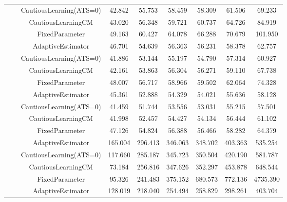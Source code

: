 \begin{table}[!h]
\begin{tabular}[t]{ccccccccc}
 &  & CautiousLearning(ATS=0) & 42.842 & 55.753 & 58.459 & 58.309 & 61.506 & 69.233\\

 &  & CautiousLearningCM & 43.020 & 56.348 & 59.721 & 60.737 & 64.726 & 84.919\\

 & \multirow[t]{-4}{*}{\centering\arraybackslash 1.00} & FixedParameter & 49.163 & 60.427 & 64.078 & 66.288 & 70.679 & 101.950\\
\cmidrule{2-9}
 &  & AdaptiveEstimator & 46.701 & 54.639 & 56.363 & 56.231 & 58.378 & 62.757\\

 &  & CautiousLearning(ATS=0) & 41.886 & 53.144 & 55.197 & 54.790 & 57.314 & 60.927\\

 &  & CautiousLearningCM & 42.161 & 53.863 & 56.304 & 56.271 & 59.110 & 67.738\\

 & \multirow[t]{-4}{*}{\centering\arraybackslash 1.25} & FixedParameter & 48.007 & 56.717 & 58.966 & 59.502 & 62.064 & 74.328\\
\cmidrule{2-9}
 &  & AdaptiveEstimator & 45.361 & 52.888 & 54.329 & 54.021 & 55.636 & 58.128\\

 &  & CautiousLearning(ATS=0) & 41.459 & 51.744 & 53.556 & 53.031 & 55.215 & 57.501\\

 &  & CautiousLearningCM & 41.998 & 52.457 & 54.427 & 54.134 & 56.444 & 61.102\\

\multirow[t]{-28}{*}{\centering\arraybackslash 50} & \multirow[t]{-4}{*}{\centering\arraybackslash 1.50} & FixedParameter & 47.126 & 54.824 & 56.388 & 56.466 & 58.282 & 64.379\\
\cmidrule{1-9}
 &  & AdaptiveEstimator & 165.004 & 296.413 & 346.063 & 348.702 & 403.363 & 535.254\\

 &  & CautiousLearning(ATS=0) & 117.660 & 285.187 & 345.723 & 350.504 & 420.190 & 581.787\\

 &  & CautiousLearningCM & 73.184 & 256.816 & 347.626 & 352.297 & 453.878 & 648.544\\

 & \multirow[t]{-4}{*}{\centering\arraybackslash 0.25} & FixedParameter & 95.326 & 241.483 & 375.152 & 680.573 & 772.136 & 4735.390\\
\cmidrule{2-9}
 &  & AdaptiveEstimator & 128.019 & 218.040 & 254.494 & 258.829 & 298.261 & 403.704\\


\end{tabular}
\end{table}
